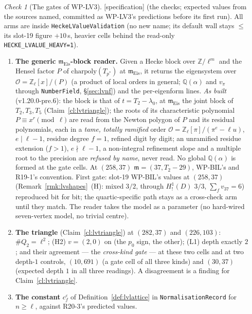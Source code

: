 \documentclass[11pt]{article}
\theoremstyle{remark}
\newtheorem{checkitem}[theorem]{Check}
\newcommand{\Z}{\mathbb{Z}}
\newcommand{\Q}{\mathbb{Q}}
\newcommand{\m}{\mathfrak{m}}
\newcommand{\SPEC}{\textsf{[specification]}}           %
\begin{document}
\begin{checkitem}[The gates of WP-LV3]\label{chk:lvtriangle}
\SPEC{} (the checks; expected values from the sources named, committed as WP-LV3's predictions before its first run). All arms are inside \texttt{HeckeLValueValidation} (no new name;
its default wall stays $\le$ its slot-19 figure $+10$\,s, heavier cells behind the read-only \texttt{HECKE\_LVALUE\_HEAVY=1}).
\begin{enumerate}
\item[(a)] \textbf{The generic $\m_{\mathrm{Eis}}$-block reader.} Given a Hecke block over $\Z/\ell^{m}$ and the Hensel factor $P$ of $\mathrm{charpoly}(T_{p^\ast})$ at $\m_{\mathrm{Eis}}$, it
  returns the eigensystem over $\mathcal O=\Z_\ell[x]/(P)$ (a product of local orders in general; $\Q(\alpha)$ and $v_\pi$ through \texttt{NumberField}, \S\ref{sec:lvnf}) and the
  per-eigenform lines. \emph{As built} (v1.20.0-pre.6): the block is that of $t=T_2-\lambda_0$, at $\m_{\mathrm{Eis}}$ the joint block of $T_2,T_3,T_5$ (Claim~\ref{cl:lvtriangle}); the roots of
  its characteristic polynomial $P\equiv x^{r}\pmod\ell$ are read from the Newton polygon of $P$ and its residual polynomials, each in a \emph{tame, totally ramified} order
  $\mathcal O=\Z_\ell[\pi]/(\pi^{e}-\ell u)$, $e\mid\ell-1$, residue degree $f=1$, refined digit by digit; an unramified residue extension ($f>1$), $e\nmid\ell-1$, a non-integral refinement slope
  and a multiple root to the precision are \emph{refused by name}, never read. No global $\Q(\alpha)$ is formed at the gate cells. At $(258,37)$ $\m=(37,T_2-29)$, WP-BIL's and R19-1's convention. First gate: slot-19 WP-BIL's values at $(258,37)$ (Remark~\ref{rmk:lvshapes}~(H): mixed $3/2$, through $H^{1}_{!}(D)$ $3/3$, $\sum_fv_{37}=6$) reproduced bit for
  bit; the quartic-specific path stays as a cross-check arm until they match. The reader takes the model as a parameter (no hard-wired seven-vertex model, no trivial centre).
\item[(b)] \textbf{The triangle} (Claim~\ref{cl:lvtriangle}) at $(282,37)$ and $(226,103)$: $\#Q_2=\ell^{2}$; (H2) $v=(2,0)$ on (the $p_0$ sign, the other); (L1) depth exactly $2$; and
  their agreement --- the \emph{cross-kind gate} --- at these two cells and at two depth-$1$ controls, $(10,691)$ (a gate cell of all three kinds) and $(30,37)$ (expected depth $1$
  in all three readings). A disagreement is a finding for Claim~\ref{cl:lvtriangle}.
\item[(c)] \textbf{The constant} $c^{\varepsilon}_f$ of Definition~\ref{def:lvlattice} in \texttt{NormalisationRecord} for $n\ge\ell$, against R20-3's predicted values.

\end{enumerate}
\end{checkitem}
\end{document}
